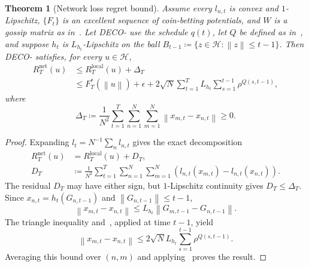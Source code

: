 \documentclass[journal]{IEEEtran}
\newtheorem{theorem}{Theorem}
\newcommand{\br}[1]{\left(#1\right)}
\newcommand{\norm}[1]{\left\lVert{#1}\right\rVert}
\newcommand{\Hil}{\mathcal{H}} %
\newcommand{\algname}{{DECO}\xspace}
\begin{document}
    {\color{blue}
        \begin{theorem}[Network loss regret bound]\label{thm:network_loss_regret_bound}
            Assume every $l_{n,t}$ is convex and $1$-Lipschitz, $\{F_t\}$ is an excellent sequence of coin-betting potentials, and $W$ is a gossip matrix as in~. Let \algname{}- use the schedule $q(t)$, let $Q$ be defined as in~, and suppose $h_t$ is $L_{h_t}$-Lipschitz on the ball
            $B_{t-1}\coloneqq\{z\in\Hil:\norm{z}\leq t-1\}$.
            Then \algname{}- satisfies, for every $u\in\Hil$,
            \begin{align}
                R_T^{\mathrm{net}}(u)
                 & \leq R_T^{\mathrm{local}}(u)+\Delta_T \\
                 & \leq F_T^*(\norm{u})+\epsilon
                +2\sqrt{N}\sum_{t=1}^T L_{h_t}
                \sum_{s=1}^{t-1}\rho^{Q(s,t-1)},
            \end{align}
            where
            \begin{equation}
                \Delta_T\coloneqq\frac{1}{N^2}
                \sum_{t=1}^T\sum_{n=1}^N\sum_{m=1}^N
                \norm{x_{m,t}-x_{n,t}}\geq0.
            \end{equation}
        \end{theorem}
        \begin{proof}
            Expanding $l_t=N^{-1}\sum_n l_{n,t}$ gives the exact decomposition
            \begin{align}
                R_T^{\mathrm{net}}(u) & =R_T^{\mathrm{local}}(u)+D_T,                              \\
                D_T                   & \coloneqq\frac{1}{N^2}\sum_{t=1}^T\sum_{n=1}^N\sum_{m=1}^N
                \br{l_{n,t}(x_{m,t})-l_{n,t}(x_{n,t})}.
                \label{eq:disagreement}
            \end{align}
            The residual $D_T$ may have either sign, but $1$-Lipschitz continuity gives
            $D_T\leq\Delta_T$.
            Since $x_{n,t}=h_t(G_{n,t-1})$ and $\norm{G_{n,t-1}}\leq t-1$,
            \begin{equation}
                \norm{x_{m,t}-x_{n,t}}
                \leq L_{h_t}\norm{G_{m,t-1}-G_{n,t-1}}.
            \end{equation}
            The triangle inequality and~, applied at time $t-1$, yield
            \begin{equation}\label{eq:decision-disagreement-bound}
                \norm{x_{m,t}-x_{n,t}}
                \leq2\sqrt{N}L_{h_t}\sum_{s=1}^{t-1}\rho^{Q(s,t-1)}.
            \end{equation}
            Averaging this bound over $(n,m)$ and applying~ proves the result.
        \end{proof}
    }
\end{document}

